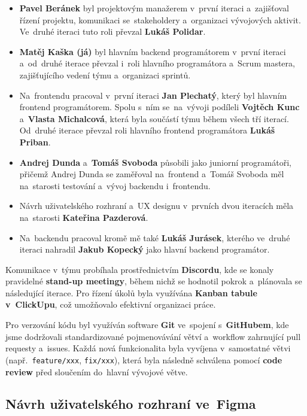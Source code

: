 \documentclass[male,czech,api_bc]{kitheses}
\begin{document}
\begin{itemize}
	\item \textbf{Pavel Beránek} byl projektovým manažerem v~první iteraci a~zajišťoval řízení projektu, komunikaci se~stakeholdery a~organizaci vývojových aktivit. Ve~druhé iteraci tuto roli převzal \textbf{Lukáš Polidar}.
	\item \textbf{Matěj Kaška (já)} byl hlavním backend programátorem v~první iteraci a~od~druhé iterace převzal i~roli hlavního programátora a~Scrum mastera, zajišťujícího vedení týmu a~organizaci sprintů.
	\item Na~frontendu pracoval v~první iteraci \textbf{Jan Plechatý}, který byl hlavním frontend programátorem. Spolu s~ním se~na~vývoji podíleli \textbf{Vojtěch Kunc} a~\textbf{Vlasta Michalcová}, která byla součástí týmu během všech tří iterací. Od~druhé iterace převzal roli hlavního frontend programátora \textbf{Lukáš Priban}.
	\item \textbf{Andrej Dunda} a~\textbf{Tomáš Svoboda} působili jako juniorní programátoři, přičemž Andrej Dunda se zaměřoval na~frontend a~Tomáš Svoboda měl na~starosti testování a~vývoj backendu i~frontendu.
	\item Návrh uživatelského rozhraní a~UX designu v~prvních dvou iteracích měla na~starosti \textbf{Kateřina Pazderová}.
	\item Na~backendu pracoval kromě mě také \textbf{Lukáš Jurásek}, kterého ve~druhé iteraci nahradil \textbf{Jakub Kopecký} jako hlavní backend programátor.
\end{itemize}

Komunikace v~týmu probíhala prostřednictvím \textbf{Discordu}, kde se konaly pravidelné \textbf{stand-up meetingy}, během nichž se hodnotil pokrok a~plánovala se následující iterace. Pro řízení úkolů byla využívána \textbf{Kanban tabule v~ClickUpu}, což umožňovalo efektivní organizaci práce.

Pro verzování kódu byl využíván software \textbf{Git} ve~spojení s~\textbf{GitHubem}, kde jsme dodržovali standardizované pojmenovávání větví a~workflow zahrnující pull requesty a~issues. Každá nová funkcionalita byla vyvíjena v~samostatné větvi (např.~\texttt{feature/xxx}, \texttt{fix/xxx}), která byla následně schválena pomocí \textbf{code review} před sloučením do~hlavní vývojové větve.

\subsection{Návrh uživatelského rozhraní ve~Figma}
\end{document}
